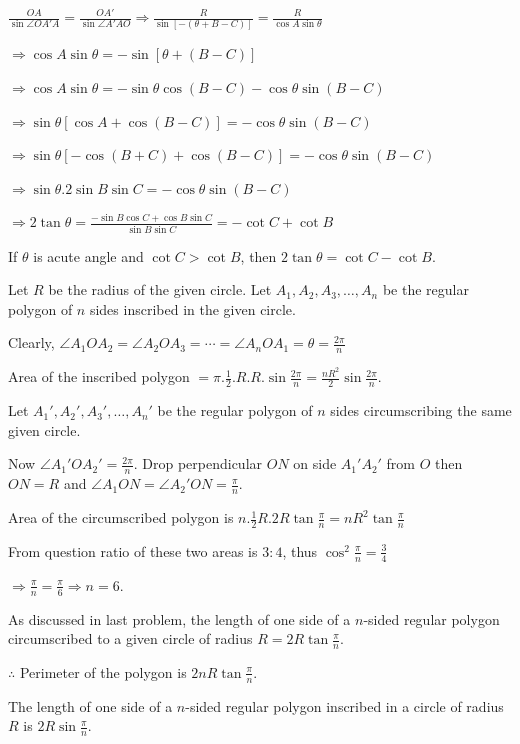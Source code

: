   $\frac{OA}{\sin\angle OA'A} = \frac{OA'}{\sin\angle A'AO}\Rightarrow \frac{R}{\sin[-(\theta + B - C)]}
  = \frac{R}{\cos A\sin\theta}$

  $\Rightarrow \cos A\sin\theta = -\sin[\theta + (B - C)]$

  $\Rightarrow \cos A\sin\theta = -\sin\theta\cos(B - C) - \cos\theta\sin(B - C)$

  $\Rightarrow \sin\theta[\cos A + \cos(B - C)] = -\cos\theta\sin(B - C)$

  $\Rightarrow \sin\theta[-\cos(B + C) + \cos(B - C)] = -\cos\theta\sin(B - C)$

  $\Rightarrow \sin\theta.2\sin B\sin C = -\cos\theta\sin(B - C)$

  $\Rightarrow 2\tan\theta = \frac{-\sin B\cos C + \cos B\sin C}{\sin B\sin C} = -\cot C + \cot B$

  If $\theta$ is acute angle and $\cot C > \cot B$, then $2\tan\theta = \cot C - \cot B$.
\item Let $R$ be the radius of the given circle. Let $A_1, A_2, A_3, \ldots, A_n$ be the regular polygon of
  $n$ sides inscribed in the given circle.

  Clearly, $\angle A_1OA_2 = \angle A_2OA_3 = \cdots = \angle A_nOA_1 = \theta = \frac{2\pi}{n}$

  Area of the inscribed polygon $= \pi.\frac{1}{2}.R.R.\sin\frac{2\pi}{n}
  = \frac{nR^2}{2}\sin\frac{2\pi}{n}$.

  Let $A_1', A_2', A_3', \ldots, A_n'$ be the regular polygon of $n$ sides circumscribing the same given
  circle.

  Now $\angle A_1'OA_2' = \frac{2\pi}{n}$. Drop perpendicular $ON$ on side $A_1'A_2'$ from $O$ then $ON = R$
  and $\angle A_1ON = \angle A_2'ON = \frac{\pi}{n}$.

  Area of the circumscribed polygon is $n.\frac{1}{2}R.2R\tan\frac{\pi}{n} = nR^2\tan\frac{\pi}{n}$

  From question ratio of these two areas is $3:4$, thus $\cos^2\frac{\pi}{n} = \frac{3}{4}$

  $\Rightarrow \frac{\pi}{n} = \frac{\pi}{6}\Rightarrow n = 6$.
\item As discussed in last problem, the length of one side of a $n$-sided regular polygon circumscribed to a
  given circle of radius $R = 2R\tan\frac{\pi}{n}$.

  $\therefore$ Perimeter of the polygon is $2nR\tan\frac{\pi}{n}$.

  The length of one side of a $n$-sided regular polygon inscribed in a circle of radius $R$ is
  $2R\sin\frac{\pi}{n}$.

